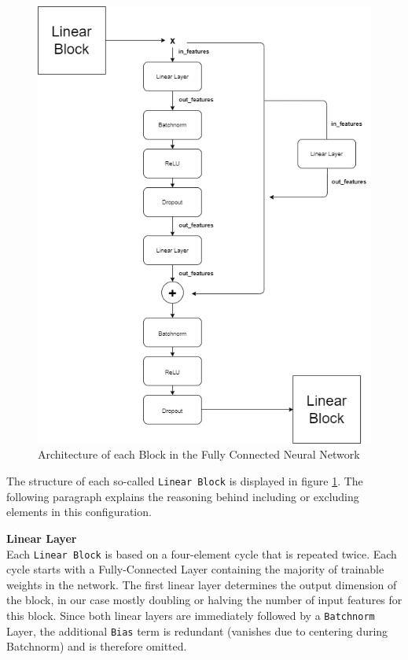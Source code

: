 \documentclass[12pt, letterpaper]{article}
\begin{document}
\begin{figure}[ht]
    \centering
    \includegraphics[width=\textwidth]{mlp_architecture.png}
    \caption{Architecture of each Block in the Fully Connected Neural Network}
    \label{fig:linear-block}
\end{figure}

The structure of each so-called \texttt{Linear Block} is displayed in figure \ref{fig:linear-block}.
The following paragraph explains the reasoning behind including or excluding elements in this configuration.

\textbf{Linear Layer} \\
Each \texttt{Linear Block} is based on a four-element cycle that is repeated twice.
Each cycle starts with a Fully-Connected Layer containing the majority of trainable weights in the network.
The first linear layer determines the output dimension of the block, in our case mostly doubling or halving the number of input features for this block.
Since both linear layers are immediately followed by a \texttt{Batchnorm} Layer, the additional \texttt{Bias} term is redundant (vanishes due to centering during Batchnorm) and is therefore omitted.
\end{document}
